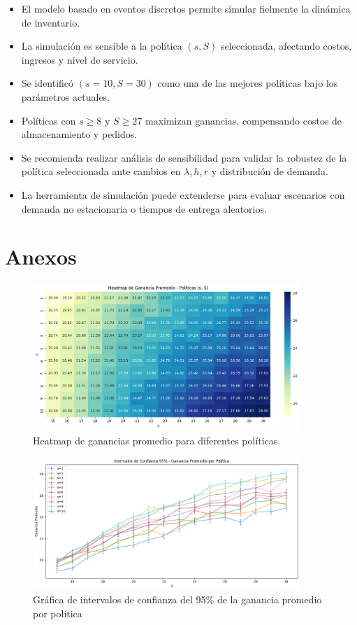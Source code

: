 \documentclass{report}
\begin{document}
\begin{itemize}
\item El modelo basado en eventos discretos permite simular fielmente la dinámica de 
inventario.
\item La simulación es sensible a la política \((s, S)\) seleccionada, afectando costos, 
ingresos y nivel de servicio.
\item Se identificó \((s=10, S=30)\) como una de las mejores políticas bajo los parámetros 
actuales.
\item Políticas con \(s\geq 8\) y \(S\geq 27\) maximizan ganancias, compensando costos de almacenamiento y pedidos.
\item Se recomienda realizar análisis de sensibilidad para validar la robustez de la política 
seleccionada ante cambios en \(\lambda, h, r\) y distribución de demanda.
\item La herramienta de simulación puede extenderse para evaluar escenarios con demanda no 
estacionaria o tiempos de entrega aleatorios.
\end{itemize}


\section*{Anexos}

\begin{figure}[h]
    \centering
    \includegraphics[width=0.9\textwidth]{ganacias_promedio_variando_politica.png}
    \caption{Heatmap de ganancias promedio para diferentes políticas.}
\end{figure}

\begin{figure}[h]
  \centering
  \includegraphics[width=0.9\textwidth]{intervalos_de_confianza_ganacia_promedio_politica.png}
  \caption{Gráfica de intervalos de confianza del 95\% de la ganancia promedio por política}
\end{figure}
\end{document}

